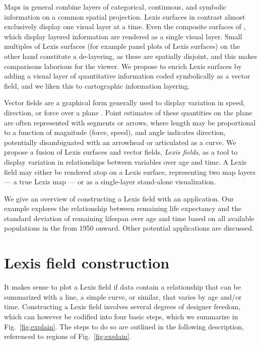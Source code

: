 \documentclass{article}
\begin{document}
Maps in general combine layers of categorical, continuous, and
symbolic information on a common spatial projection. Lexis surfaces in contrast almost exclusively display one visual layer at a time. Even the composite surfaces of \citet{scholey2017visualizing}, which display layered information are rendered as a single visual layer. Small multiples of Lexis surfaces (for example panel plots of Lexis surfaces) on the other hand constitute a de-layering, as these are spatially disjoint, and this makes comparisons laborious for the viewer. We propose to enrich Lexis surfaces by adding a visual layer of quantitative information coded symbolically as a vector field, and we liken this to cartographic information layering.

Vector fields are a graphical form generally used to display variation in speed, direction, or force over a plane \citep{weiskopf2007vector}. Point estimates of these quantities on the plane are often represented with segments or arrows, where length may be proportional to a function of magnitude (force, speed), and angle indicates direction, potentially disambiguated with an arrowhead or articulated as a curve. We propose a fusion of Lexis surfaces and vector fields, \emph{Lexis fields}, as a tool to display variation in relationships between variables over age and time. A Lexis field may either be rendered atop on a Lexis surface, representing two map layers --- a true Lexis map --- or as a single-layer stand-alone visualization. 

We give an overview of constructing a Lexis field with an application. Our example explores the relationship between remaining life expectancy and the standard deviation of remaining lifespan over age and time based on all available populations in the \citet{HMD} from 1950 onward. Other potential applications are discussed.

\section{Lexis field construction}

It makes sense to plot a Lexis field if data contain a relationship that can be summarized with a line, a simple curve, or similar, that varies by age and/or time. Constructing a Lexis field involves several degrees of designer freedom, which can however be codified into four basic steps, which we summarize in Fig.~\ref{fig:explain}. The steps to do so are outlined in the following description, referenced to regions of Fig.~\ref{fig:explain}.
\end{document}
